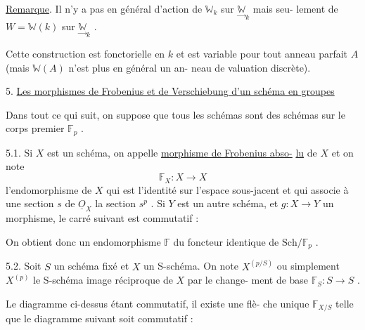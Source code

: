 \documentclass[11pt]{article}
\newcommand{\scanpage}[1]{\par\bigskip\noindent{\small\sffamily[scan #1]}\par}
\newcommand{\mspage}[1]{{\small\sffamily[p.\,#1]}}
\newcommand{\uline}[1]{\underline{#1}}
\newenvironment{diagramblock}{\par\begin{center}}{\end{center}\par}
\begin{document}
\uline{Remarque}. Il n'y a pas en général d'action de $\mathbb{W}_k$ sur $\underset{\rightarrow}{\mathbb{W}}_k$ mais seu-%
lement de $W = \mathbb{W}(k)$ sur $\underset{\rightarrow}{\mathbb{W}}_k$ .

Cette construction est fonctorielle en $k$ et est variable
pour tout anneau parfait $A$ (mais $\mathbb{W}(A)$ n'est plus en général un an-%
neau de valuation discrète).

5. \uline{Les morphismes de Frobenius et de Verschiebung d'un schéma en groupes}

Dans tout ce qui suit, on suppose que tous les schémas sont
des schémas sur le corps premier $\mathbb{F}_p$ .

5.1. Si $X$ est un schéma, on appelle \uline{morphisme de Frobenius abso-}%
\uline{lu} de $X$ et on note
\[
\mathbb{F}_X : X \rightarrow X
\]
l'endomorphisme de $X$ qui est l'identité sur l'espace sous-jacent et qui
associe à une section $s$ de $\underline{O}_X$ la section $s^p$ . Si $Y$ est un autre
schéma, et $g : X \rightarrow Y$ un morphisme, le carré suivant est commutatif :

\mspage{24}

\clearpage
\scanpage{129/25}
\begin{diagramblock}\end{diagramblock}

On obtient donc un endomorphisme $\mathbb{F}$ du foncteur identique de $\mathrm{Sch}/\mathbb{F}_p$ .

5.2. Soit $S$ un schéma fixé et $X$ un S-schéma. On note $X^{(p/S)}$
ou simplement $X^{(p)}$ le S-schéma image réciproque de $X$ par le change-%
ment de base $\mathbb{F}_S : S \to S$ .

Le diagramme ci-dessus étant commutatif, il existe une flè-%
che unique $\mathbb{F}_{X/S}$ telle que le diagramme suivant soit commutatif :

\begin{diagramblock}\end{diagramblock}
\end{document}
